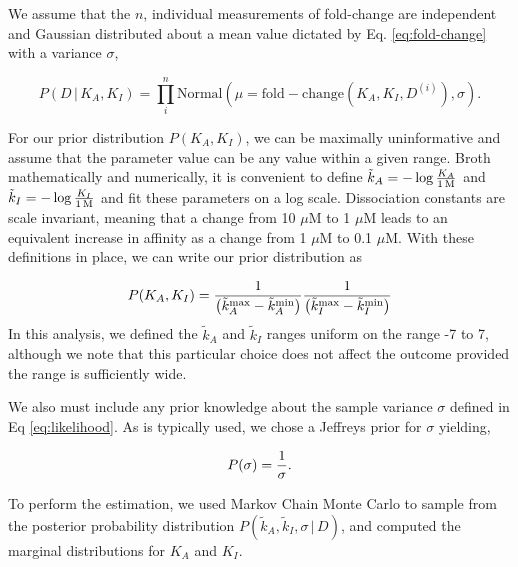 \documentclass[letterpaper, 10pt]{article}
\begin{document}
We assume that the $n$, individual measurements of fold-change are independent and
Gaussian distributed about a mean value dictated by Eq. \ref{eq:fold-change}
with a variance $\sigma$,

\begin{equation}
  P(D\, \vert \, K_A, K_I) = \prod\limits_i^n\mathrm{Normal}\left(\mu = \mathrm{fold-change}\left(K_A, K_I, D^{(i)}\right),
  \sigma\right).
  \label{eq:likelihood}
\end{equation}

For our prior distribution $P(K_A, K_I)$, we can be maximally uninformative and
assume that the parameter value can be any value within a given range. Broth
mathematically and numerically, it is convenient to define $\tilde{k}_A = -\log{K_A \over 1\,\text{M}}$
and $\tilde{k}_I = -\log{K_I \over 1\,\text{M}}$ and fit these parameters on a
log scale. Dissociation constants are scale invariant, meaning that a change
from 10 $\mu$M to 1 $\mu$M leads to an equivalent increase in affinity as a
change from 1 $\mu$M to 0.1 $\mu$M.  With these definitions in place, we can
write our prior distribution as

\begin{equation}
P(K_A, K_I) = {1 \over \left(\tilde{k}_A^\text{max} - \tilde{k}_A^\text{min}\right)}{1 \over \left(\tilde{k}_I^\text{max} - \tilde{k}_I^\text{min}\right)}
\end{equation}
In this analysis, we  defined the $\tilde{k}_A$ and $\tilde{k}_I$ ranges uniform
on the range -7 to 7, although we note that this particular choice does not affect
the outcome provided the range is sufficiently wide.

We also must include any prior knowledge about the sample variance $\sigma$ defined
in Eq \ref{eq:likelihood}. As is typically used, we chose a Jeffreys prior \cite{Sivia2006}
for $\sigma$ yielding,

\begin{equation}
  P(\sigma) = {1 \over \sigma}.
  \label{eq:Jeffreys}
\end{equation}

To perform the estimation, we used Markov Chain Monte Carlo to sample from the
posterior probability distribution $P(\tilde{k}_A, \tilde{k}_I, \sigma\,\vert\, D)$,
and computed the marginal distributions for $K_A$ and $K_I$.


\printbibliography
\end{document}
